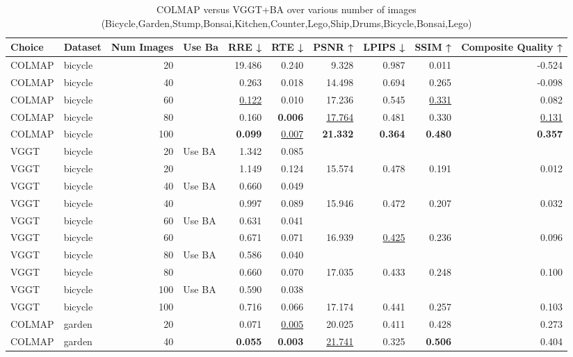 \begin{table}[H]
\caption{COLMAP versus VGGT+BA over various number of images (Bicycle,Garden,Stump,Bonsai,Kitchen,Counter,Lego,Ship,Drums,Bicycle,Bonsai,Lego)}
\label{tab:01_num_images_use_ba_bicycle,garden,stump,bonsai,kitchen,counter,lego,ship,drums,bicycle,bonsai,lego}
\small
\begin{tabular}{llrlrrrrrr}
\toprule
Choice & Dataset & Num Images & Use Ba & RRE ↓ & RTE ↓ & PSNR ↑ & LPIPS ↓ & SSIM ↑ & Composite Quality ↑ \\
\midrule
COLMAP & bicycle & 20 &  & 19.486 & 0.240 & 9.328 & 0.987 & 0.011 & -0.524 \\
COLMAP & bicycle & 40 &  & 0.263 & 0.018 & 14.498 & 0.694 & 0.265 & -0.098 \\
COLMAP & bicycle & 60 &  & \underline{0.122} & 0.010 & 17.236 & 0.545 & \underline{0.331} & 0.082 \\
COLMAP & bicycle & 80 &  & 0.160 & \textbf{0.006} & \underline{17.764} & 0.481 & 0.330 & \underline{0.131} \\
COLMAP & bicycle & 100 &  & \textbf{0.099} & \underline{0.007} & \textbf{21.332} & \textbf{0.364} & \textbf{0.480} & \textbf{0.357} \\
VGGT & bicycle & 20 & Use BA & 1.342 & 0.085 &  &  &  &  \\
VGGT & bicycle & 20 &  & 1.149 & 0.124 & 15.574 & 0.478 & 0.191 & 0.012 \\
VGGT & bicycle & 40 & Use BA & 0.660 & 0.049 &  &  &  &  \\
VGGT & bicycle & 40 &  & 0.997 & 0.089 & 15.946 & 0.472 & 0.207 & 0.032 \\
VGGT & bicycle & 60 & Use BA & 0.631 & 0.041 &  &  &  &  \\
VGGT & bicycle & 60 &  & 0.671 & 0.071 & 16.939 & \underline{0.425} & 0.236 & 0.096 \\
VGGT & bicycle & 80 & Use BA & 0.586 & 0.040 &  &  &  &  \\
VGGT & bicycle & 80 &  & 0.660 & 0.070 & 17.035 & 0.433 & 0.248 & 0.100 \\
VGGT & bicycle & 100 & Use BA & 0.590 & 0.038 &  &  &  &  \\
VGGT & bicycle & 100 &  & 0.716 & 0.066 & 17.174 & 0.441 & 0.257 & 0.103 \\
\midrule
COLMAP & garden & 20 &  & 0.071 & \underline{0.005} & 20.025 & 0.411 & 0.428 & 0.273 \\
COLMAP & garden & 40 &  & \textbf{0.055} & \textbf{0.003} & \underline{21.741} & 0.325 & \textbf{0.506} & 0.404 \\

\end{tabular}
\end{table}
